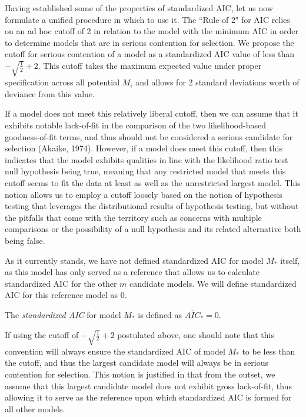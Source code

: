 		Having established some of the properties of standardized AIC, let us now formulate a unified procedure in which to use it. The ``Rule of 2" for AIC relies on an ad hoc cutoff of 2 in 
		relation to the model with the minimum AIC in order to determine models that are in serious contention for selection. We propose the cutoff for serious contention of a model as a
		standardized AIC value of less than $-\sqrt{\frac{1}{2}} + 2$. This cutoff takes the maximum expected value under proper specification across all potential $M_i$ and allows for 2 standard deviations worth of
		deviance from this value.
		
		If a model does not meet this relatively liberal cutoff, then we can assume that it exhibits notable lack-of-fit in the comparison of the two likelihood-based goodness-of-fit terms,
		and thus should not be considered a serious candidate for selection (Akaike, 1974). However, if a model does meet this cutoff, then this indicates that the model exhibits qualities in line with the
		likelihood ratio test null hypothesis being true, meaning that any restricted model that meets this cutoff seems to fit the data at least as well as the unrestricted largest model.
		This notion allows us to employ a cutoff loosely based on the notion of hypothesis testing that leverages the distributional results of hypothesis testing, but without the pitfalls
		that come with the territory such as concerns with multiple comparisons or the possibility of a null hypothesis and its related alternative both being false.

		As it currently stands, we have not defined standardized AIC for model $M_*$ itself, as this model has only served as a reference that allows us to calculate standardized AIC for the
		other $m$ candidate models. We will define standardized AIC for this reference model as $0$.
		\begin{definition}
			The \textit{standardized AIC} for model $M_*$ is defined as $\overline{AIC}_* = 0$.
		\end{definition}
		If using the cutoff of $-\sqrt{\frac{1}{2}} + 2$ postulated above, one should note that this convention will always ensure the standardized AIC of model $M_*$ to be less than the
		cutoff, and thus the largest candidate model will always be in serious contention for selection. This notion is justified in that from the outset, we assume that this largest
		candidate model does not exhibit gross lack-of-fit, thus allowing it to serve as the reference upon which standardized AIC is formed for all other models.

